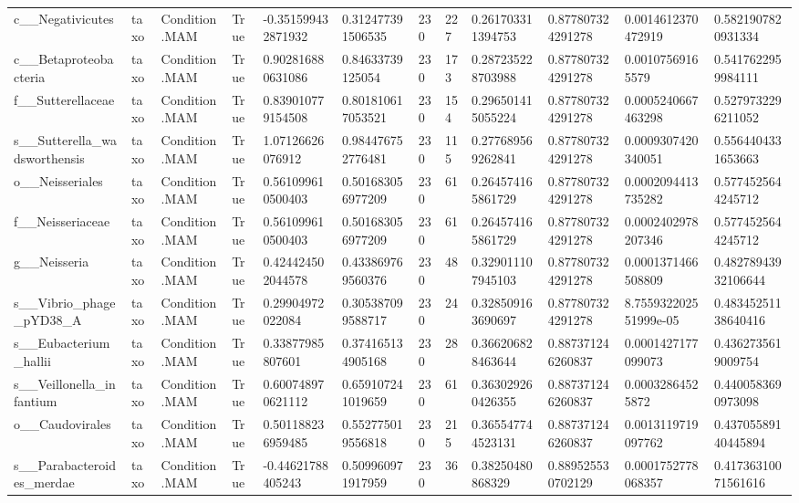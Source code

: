 \begin{longtable}{llllllllllll}
c\_\_Negativicutes & taxo & Condition.MAM & True & -0.351599432871932 & 0.312477391506535 & 230 & 227 & 0.261703311394753 & 0.877807324291278 & 0.0014612370472919 & 0.5821907820931334 \\
c\_\_Betaproteobacteria & taxo & Condition.MAM & True & 0.902816880631086 & 0.84633739125054 & 230 & 173 & 0.287235228703988 & 0.877807324291278 & 0.00107569165579 & 0.5417622959984111 \\
f\_\_Sutterellaceae & taxo & Condition.MAM & True & 0.839010779154508 & 0.801810617053521 & 230 & 154 & 0.296501415055224 & 0.877807324291278 & 0.0005240667463298 & 0.5279732296211052 \\
s\_\_Sutterella\_wadsworthensis & taxo & Condition.MAM & True & 1.07126626076912 & 0.984476752776481 & 230 & 115 & 0.277689569262841 & 0.877807324291278 & 0.0009307420340051 & 0.5564404331653663 \\
o\_\_Neisseriales & taxo & Condition.MAM & True & 0.561099610500403 & 0.501683056977209 & 230 & 61 & 0.264574165861729 & 0.877807324291278 & 0.0002094413735282 & 0.5774525644245712 \\
f\_\_Neisseriaceae & taxo & Condition.MAM & True & 0.561099610500403 & 0.501683056977209 & 230 & 61 & 0.264574165861729 & 0.877807324291278 & 0.0002402978207346 & 0.5774525644245712 \\
g\_\_Neisseria & taxo & Condition.MAM & True & 0.424424502044578 & 0.433869769560376 & 230 & 48 & 0.329011107945103 & 0.877807324291278 & 0.0001371466508809 & 0.48278943932106644 \\
s\_\_Vibrio\_phage\_pYD38\_A & taxo & Condition.MAM & True & 0.29904972022084 & 0.305387099588717 & 230 & 24 & 0.328509163690697 & 0.877807324291278 & 8.755932202551999e-05 & 0.48345251138640416 \\
s\_\_Eubacterium\_hallii & taxo & Condition.MAM & True & 0.33877985807601 & 0.374165134905168 & 230 & 28 & 0.366206828463644 & 0.887371246260837 & 0.0001427177099073 & 0.4362735619009754 \\
s\_\_Veillonella\_infantium & taxo & Condition.MAM & True & 0.600748970621112 & 0.659107241019659 & 230 & 61 & 0.363029260426355 & 0.887371246260837 & 0.00032864525872 & 0.4400583690973098 \\
o\_\_Caudovirales & taxo & Condition.MAM & True & 0.501188236959485 & 0.552775019556818 & 230 & 215 & 0.365547744523131 & 0.887371246260837 & 0.0013119719097762 & 0.43705589140445894 \\
s\_\_Parabacteroides\_merdae & taxo & Condition.MAM & True & -0.44621788405243 & 0.509960971917959 & 230 & 36 & 0.38250480868329 & 0.889525530702129 & 0.0001752778068357 & 0.41736310071561616 \\

\end{longtable}
